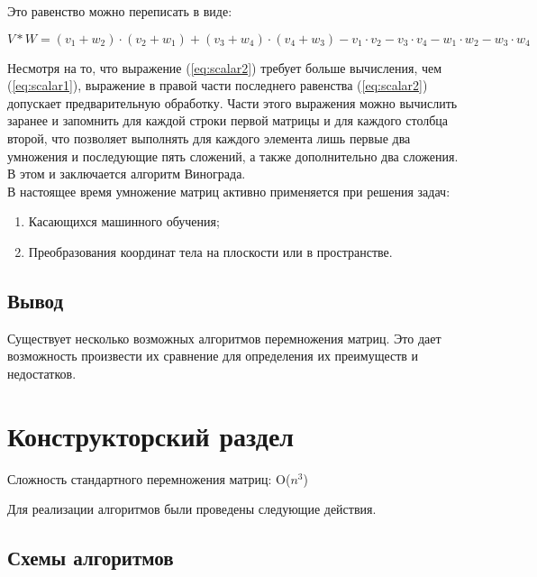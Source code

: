 \documentclass[12pt,a4paper]{scrartcl}
\begin{document}
Это равенство можно переписать в виде: 

\begin{equation}\label{eq:scalar2}
V * W = (v_1 + w_2) \cdot (v_2 + w_1) + (v_3 + w_4) \cdot (v_4 + w_3) - v_1 \cdot v_2 - v_3 \cdot v_4 - w_1 \cdot w_2 - w_3 \cdot w_4
\end{equation}

Несмотря на то, что выражение (\ref{eq:scalar2}) требует больше вычисления, чем (\ref{eq:scalar1}), выражение в правой части последнего равенства (\ref{eq:scalar2}) допускает предварительную обработку. 
Части этого выражения можно вычислить заранее и запомнить для каждой строки первой матрицы и для каждого столбца второй, что позволяет выполнять для каждого элемента лишь первые два умножения и последующие пять сложений, а также дополнительно два сложения.
В этом и заключается алгоритм Винограда.\\ 

В настоящее время умножение матриц активно применяется при решения задач:

\begin{enumerate}
	\item {Касающихся машинного обучения; }
	\item {Преобразования координат тела на плоскости или в пространстве.} 	
\end{enumerate}

\subsection{Вывод}
\label{sec:analitics:conclusion}

Существует несколько возможных алгоритмов перемножения матриц. Это дает возможность произвести их сравнение для определения их преимуществ и недостатков.

\newpage
\section{Конструкторский раздел}
\label{sec:construct}

Сложность стандартного перемножения матриц: O($n^3$)


Для реализации алгоритмов были проведены следующие действия.

\subsection{Схемы алгоритмов}
\label{sec:construct:schemes}
\end{document}
